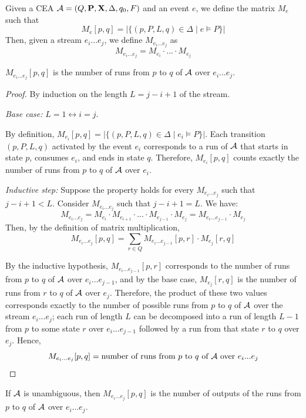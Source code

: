 
Given a CEA $\mathcal{A} = (Q, \mathbf{P}, \mathbf{X}, \Delta, q_0, F)$ and an event $e$, we define the matrix $M_e$ such that
$$M_e[p,q] = |\{(p,P,L,q)\in\Delta \mid e\vDash P\}|$$
Then, given a stream $e_i...e_j$, we define $M_{e_i...e_j}$ as
$$M_{e_i...e_j} = M_{e_i} \cdot ... \cdot M_{e_j}$$
\begin{lemma}\label{lemma:run_count}
    $M_{e_i...e_j}[p,q]$ is the number of runs from $p$ to $q$ of $\mathcal{A}$ over $e_i...e_j$.
\end{lemma}

\begin{proof} By induction on the length $L = j - i + 1$ of the stream.

\noindent\emph{Base case:} $L = 1 \longleftrightarrow i = j$.

    By definition, $M_{e_i}[p,q]=|\{(p,P,L,q)\in\Delta \mid e_i\vDash P\}|$. Each transition $(p,P,L,q)$ activated by the event $e_i$ corresponds to a run of $\mathcal{A}$ that starts in state $p$, consumes $e_i$, and ends in state $q$. Therefore, $M_{e_i}[p,q]$ counts exactly the number of runs from $p$ to $q$ of $\mathcal{A}$ over $e_i$.  
    
\noindent\emph{Inductive step:} Suppose the property holds for every $M_{e_i...e_j}$ such that $j - i + 1 < L$. Consider $M_{e_i...e_j}$ such that $j - i + 1 = L$.
    We have: 
    $$M_{e_i...e_j} = M_{e_i} \cdot M_{e_{i+1}} \cdot ... \cdot M_{e_{j-1}} \cdot M_{e_j} = M_{e_i...e_{j-1}}\cdot M_{e_j}$$
    Then, by the definition of matrix multiplication, 
    $$M_{e_i...e_j}[p,q] = \sum_{r\in Q} M_{e_i...e_{j-1}}[p,r]\cdot M_{e_j}[r,q]$$

    By the inductive hypothesis, $M_{e_i...e_{j-1}}[p,r]$ corresponds to the number of runs from $p$ to $q$ of $\mathcal{A}$ over $e_i...e_{j-1}$, and by the base case, $M_{e_j}[r,q]$ is the number of runs from $r$ to $q$ of $\mathcal{A}$ over $e_j$.
    Therefore, the product of these two values corresponds exactly to the number of possible runs from $p$ to $q$ of $\mathcal{A}$ over the stream $e_i...e_j$; each run of length $L$ can be decomposed into a run of length $L - 1$ from $p$ to some state $r$ over $e_i...e_{j-1}$ followed by a run from that state $r$ to $q$ over $e_j$.
    Hence, $$M_{e_i...e_j}[p,q] = \text{number of runs from  $p$ to $q$ of $\mathcal{A}$ over } e_i...e_j$$

\end{proof}

\begin{lemma}\label{lemma:output_count}
    If $\mathcal{A}$ is unambiguous, then $M_{e_i...e_j}[p,q]$ is the number of outputs of the runs from $p$ to $q$ of $\mathcal{A}$ over $e_i...e_j$. 
\end{lemma}

